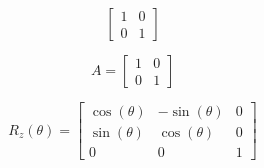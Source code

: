 \documentclass{article}
\begin{document}


\[
\begin{bmatrix}
	1 & 0 \\
	0 & 1
\end{bmatrix}
\]


\[
A = 
\begin{bmatrix}
	1 & 0 \\
	0 & 1
\end{bmatrix}
\]


\[    %
R_z (\theta)=
\begin{bmatrix}
    \cos(\theta) & -\sin(\theta)  & 0 \\
    \sin(\theta) &  \cos(\theta)  & 0 \\
    0            & 0             & 1
\end{bmatrix}
\]    %
\end{document}
